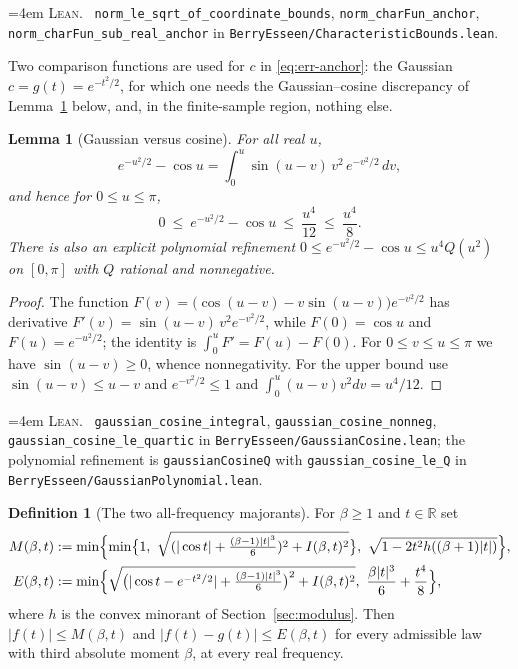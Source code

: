 \documentclass[10pt,a4paper]{article}
\theoremstyle{plain}
\newtheorem{lemma}[theorem]{Lemma}
\theoremstyle{definition}
\newtheorem{definition}[theorem]{Definition}
\newcommand{\R}{\mathbb{R}}
\newcommand{\lean}[1]{\texttt{#1}}
\newcommand{\file}[1]{\texttt{#1}}
\newenvironment{leanref}%
  {\par\addvspace{3pt}\begingroup\sloppy\emergencystretch=4em
   \noindent\footnotesize\textsc{Lean.}\ \ignorespaces}%
  {\par\endgroup\addvspace{3pt}}
\begin{document}
\begin{leanref}
\lean{norm\_le\_sqrt\_of\_coordinate\_bounds}, \lean{norm\_charFun\_anchor},
\lean{norm\_charFun\_sub\_real\_anchor} in
\file{BerryEsseen/CharacteristicBounds.lean}.
\end{leanref}

Two comparison functions are used for $c$ in \eqref{eq:err-anchor}: the
Gaussian $c=g(t)=e^{-t^2/2}$, for which one needs the Gaussian--cosine
discrepancy of Lemma~\ref{lem:gauss-cos} below, and, in the finite-sample
region, nothing else.

\begin{lemma}[Gaussian versus cosine]\label{lem:gauss-cos}
For all real $u$,
\[
  e^{-u^2/2}-\cos u = \int_0^u \sin(u-v)\,v^2\,e^{-v^2/2}\,dv,
\]
and hence for $0\le u\le\pi$,
\[
  0 \ \le\ e^{-u^2/2}-\cos u \ \le\ \frac{u^4}{12}
  \ \le\ \frac{u^4}{8}.
\]
There is also an explicit polynomial refinement
$0\le e^{-u^2/2}-\cos u\le u^4Q(u^2)$ on $[0,\pi]$ with $Q$ rational and
nonnegative.
\end{lemma}

\begin{proof}
The function $F(v)=\bigl(\cos(u-v)-v\sin(u-v)\bigr)e^{-v^2/2}$ has derivative
$F'(v)=\sin(u-v)\,v^2e^{-v^2/2}$, while $F(0)=\cos u$ and $F(u)=e^{-u^2/2}$;
the identity is $\int_0^uF'=F(u)-F(0)$.
For $0\le v\le u\le\pi$ we have $\sin(u-v)\ge0$, whence nonnegativity. For the
upper bound use $\sin(u-v)\le u-v$ and $e^{-v^2/2}\le1$ and
$\int_0^u(u-v)v^2dv=u^4/12$.
\end{proof}

\begin{leanref}
\lean{gaussian\_cosine\_integral}, \lean{gaussian\_cosine\_nonneg},
\lean{gaussian\_cosine\_le\_quartic} in \file{BerryEsseen/GaussianCosine.lean};
the polynomial refinement is \lean{gaussianCosineQ} with
\lean{gaussian\_cosine\_le\_Q} in \file{BerryEsseen/GaussianPolynomial.lean}.
\end{leanref}

\begin{definition}[The two all-frequency majorants]\label{def:bounds}
For $\beta\ge1$ and $t\in\R$ set
\begin{align*}
  M(\beta,t) &:= \min\Bigl\{
     \min\bigl\{1,\ \sqrt{(|\cos t|+\tfrac{(\beta-1)|t|^3}{6})^2+I(\beta,t)^2}\bigr\},\
     \sqrt{1-2t^2h((\beta+1)|t|)}\Bigr\},\\
  E(\beta,t) &:= \min\Bigl\{
     \sqrt{\bigl(|\cos t-e^{-t^2/2}|+\tfrac{(\beta-1)|t|^3}{6}\bigr)^2+I(\beta,t)^2},\
     \frac{\beta|t|^3}{6}+\frac{t^4}{8}\Bigr\},
\end{align*}
where $h$ is the convex minorant of Section~\ref{sec:modulus}. Then
$|f(t)|\le M(\beta,t)$ and $|f(t)-g(t)|\le E(\beta,t)$ for every admissible law
with third absolute moment $\beta$, at every real frequency.
\end{definition}
\end{document}
